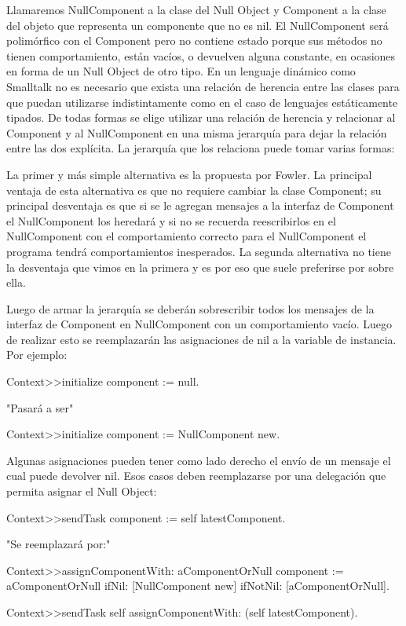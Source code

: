 Llamaremos NullComponent a la clase del Null Object y Component a la clase del objeto que representa
un componente que no es nil. El NullComponent será polimórfico con el Component pero no contiene
estado porque sus métodos no tienen comportamiento, están vacíos, o devuelven alguna constante, en
ocasiones en forma de un Null Object de otro tipo. En un lenguaje dinámico como Smalltalk no es
necesario que exista una relación de herencia entre las clases para que puedan utilizarse
indistintamente como en el caso de lenguajes estáticamente tipados. De todas formas se elige
utilizar una relación de herencia y relacionar al Component y al NullComponent en una misma
jerarquía para dejar la relación entre las dos explícita. La jerarquía que los relaciona puede tomar
varias formas:


La primer y más simple alternativa es la propuesta por Fowler. La principal ventaja de esta
alternativa es que no requiere cambiar la clase Component; su principal desventaja es que si se le
agregan mensajes a la interfaz de Component el NullComponent los heredará y si no se recuerda
reescribirlos en el NullComponent con el comportamiento correcto para el NullComponent el programa
tendrá comportamientos inesperados. La segunda alternativa no tiene la desventaja que vimos en la
primera y es por eso que suele preferirse por sobre ella.

Luego de armar la jerarquía se deberán sobrescribir todos los mensajes de la interfaz de Component
en NullComponent con un comportamiento vacío. Luego de realizar esto se reemplazarán las asignaciones de
nil a la variable de instancia. Por ejemplo:

\begin{code}
Context>>initialize
    component := null.

"Pasará a ser"

Context>>initialize
    component := NullComponent new.
\end{code}

Algunas asignaciones pueden tener como lado derecho el envío de un mensaje el cual puede devolver 
nil. Esos casos deben reemplazarse por una delegación que permita asignar el Null Object:

\begin{code}
Context>>sendTask
    component := self latestComponent.

"Se reemplazará por:"

Context>>assignComponentWith: aComponentOrNull
    component := aComponentOrNull ifNil: [NullComponent new] ifNotNil: [aComponentOrNull].

Context>>sendTask
    self assignComponentWith: (self latestComponent).
\end{code}

